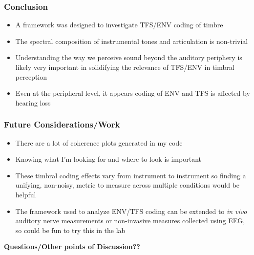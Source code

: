 \documentclass[aspectratio=1610]{beamer}
\begin{document}
\begin{frame}
\frametitle{Conclusion}
\begin{itemize}[label = $\blacktriangleright$]
\item A framework was designed to investigate TFS/ENV coding of timbre \vspace{.5em}
\item The spectral composition of instrumental tones and articulation is non-trivial
\vspace{.5em}
\item Understanding the way we perceive sound beyond the auditory periphery is likely very important in solidifying the relevance of TFS/ENV in timbral perception
\vspace{.5em}
\item Even at the peripheral level, it appears coding of ENV and TFS is affected by hearing loss
\end{itemize}

\end{frame}


\begin{frame}

\frametitle{Future Considerations/Work}

\begin{itemize}[label = $\blacktriangleright$]
\item There are a lot of coherence plots generated in my code
\vspace{.5em}
\item Knowing what I'm looking for and where to look is important
\vspace{.5em}
\item These timbral coding effects vary from instrument to instrument so finding a unifying, non-noisy, metric to measure across multiple conditions would be helpful
\vspace{.5em}
\item The framework used to analyze ENV/TFS coding can be extended to \textit{in vivo} auditory nerve measurements or non-invasive measures collected using EEG, so could be fun to try this in the lab
\vspace{.5em}
\end{itemize}
\centering
\vspace{.5em}
\textbf{Questions/Other points of Discussion??}
\end{frame}
\end{document}
